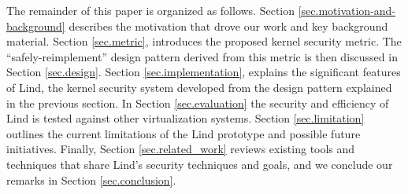 The remainder of this paper is organized as follows.
Section \ref{sec.motivation-and-background} describes the motivation that drove our work and key background material.
Section \ref{sec.metric}, introduces the proposed kernel security metric. The
``safely-reimplement'' design pattern derived from this metric is then discussed in Section \ref{sec.design}. Section \ref{sec.implementation},
explains the significant features of Lind, the kernel security system developed
from the design pattern explained in the previous section. In Section \ref{sec.evaluation} the security and efficiency of Lind is tested against other virtualization systems. 
Section \ref{sec.limitation} outlines the current
limitations of the Lind prototype and possible future initiatives.
Finally, Section \ref{sec.related_work} reviews existing tools and techniques that share
Lind's security techniques and goals, and we conclude our remarks in
Section \ref{sec.conclusion}.